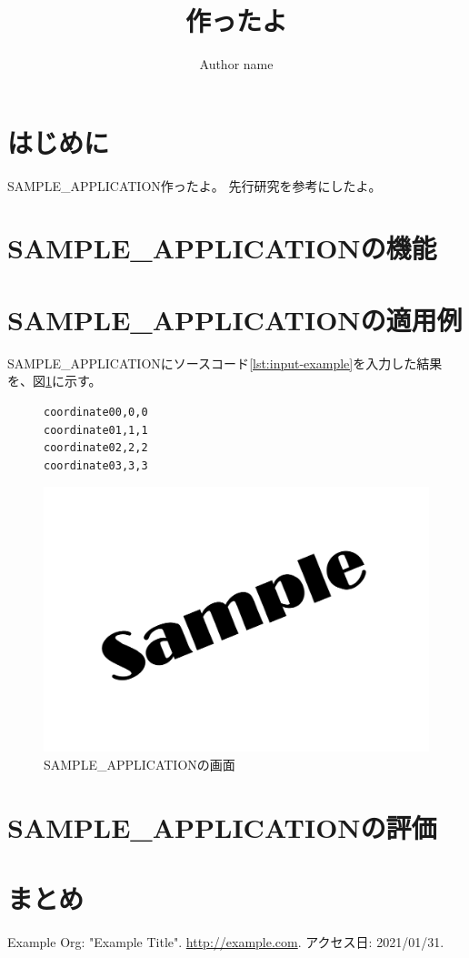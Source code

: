 \documentclass[uplatex, 10pt, a4p]{jsarticle}
\title{\tool 作ったよ}
\author{Author name}
\newcommand{\tool}{SAMPLE\_APPLICATION}  %
\begin{document}
\maketitle


\section{はじめに}\label{cha:Introduction}
\tool 作ったよ。
先行研究\cite{example}を参考にしたよ。

\section{\tool の機能}

\section{\tool の適用例}
\tool にソースコード\ref{lst:input-example}を入力した結果を、図\ref{image/sample.png}に示す。
\begin{figure}[hb]
\begin{lstlisting}[label={lst:input-example}, caption={入力例}]
coordinate00,0,0
coordinate01,1,1
coordinate02,2,2
coordinate03,3,3
\end{lstlisting}
\end{figure}

\begin{figure}[hb]
    \centering
    \includegraphics[scale=0.5]{image/sample.png}
    \caption{\tool の画面}
    \label{image/sample.png}
\end{figure}

\section{\tool の評価}


\section{まとめ}

\footnotesize

\begin{thebibliography}{0}
  Example Org: "Example Title". \url{http://example.com}. アクセス日: 2021/01/31.
\end{thebibliography}
\end{document}

